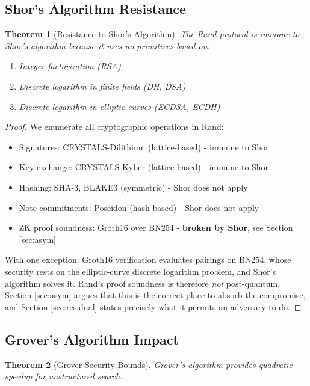 \documentclass[11pt,a4paper]{article}
\newtheorem{theorem}{Theorem}[section]
\begin{document}
\subsection{Shor's Algorithm Resistance}

\begin{theorem}[Resistance to Shor's Algorithm]
The Rand protocol is immune to Shor's algorithm because it uses no primitives based on:
\begin{enumerate}
    \item Integer factorization (RSA)
    \item Discrete logarithm in finite fields (DH, DSA)
    \item Discrete logarithm in elliptic curves (ECDSA, ECDH)
\end{enumerate}
\end{theorem}

\begin{proof}
We enumerate all cryptographic operations in Rand:
\begin{itemize}
    \item Signatures: CRYSTALS-Dilithium (lattice-based) - immune to Shor
    \item Key exchange: CRYSTALS-Kyber (lattice-based) - immune to Shor
    \item Hashing: SHA-3, BLAKE3 (symmetric) - Shor does not apply
    \item Note commitments: Poseidon (hash-based) - Shor does not apply
    \item ZK proof soundness: Groth16 over BN254 - \textbf{broken by Shor}, see Section \ref{sec:asym}
\end{itemize}
With one exception. Groth16 verification evaluates pairings on BN254, whose security rests on the elliptic-curve discrete logarithm problem, and Shor's algorithm solves it. Rand's proof soundness is therefore \emph{not} post-quantum. Section \ref{sec:asym} argues that this is the correct place to absorb the compromise, and Section \ref{sec:residual} states precisely what it permits an adversary to do.
\end{proof}

\subsection{Grover's Algorithm Impact}

\begin{theorem}[Grover Security Bounds]
Grover's algorithm provides quadratic speedup for unstructured search:
\end{theorem}
\end{document}
